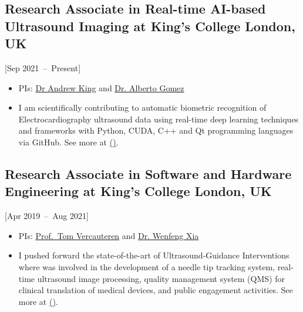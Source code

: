 \documentclass{mycv}
\begin{document}
\subsection{Research Associate in Real-time AI-based Ultrasound Imaging at King's College London, UK}[Sep 2021~--~Present]
\begin{itemize}
  \item PIs: \href{http://kclmmag.org/}{Dr Andrew King} and  \href{https://gomezalberto.github.io/}{Dr. Alberto Gomez}
  \item 
I am scientifically contributing to automatic biometric recognition of Electrocardiography ultrasound data using real-time deep learning techniques and frameworks with Python, CUDA, C++ and Qt programming languages via GitHub.
See more at \href{http://vital.oucru.org/major-partners/kings-college-london/}{(\faExternalLink)}.
\end{itemize}

\subsection{Research Associate in Software and Hardware Engineering at King's College London, UK}[Apr 2019~--~Aug 2021]
\begin{itemize}
  \item PIs: \href{https://cai4cai.ml}{Prof.~Tom Vercauteren} and  \href{https://www.purlkcl.org/}{Dr. Wenfeng Xia} 
  \item 
I pushed forward the state-of-the-art of Ultrasound-Guidance Interventions
	where was involved in the development of a needle tip tracking system, real-time ultrasound image processing, 
	quality management system (QMS) for clinical translation of medical devices, and public engagement activities.
	See more at \href{https://cai4cai.ml/author/miguel-xochicale/}{(\faExternalLink)}.
\end{itemize}
\end{document}
